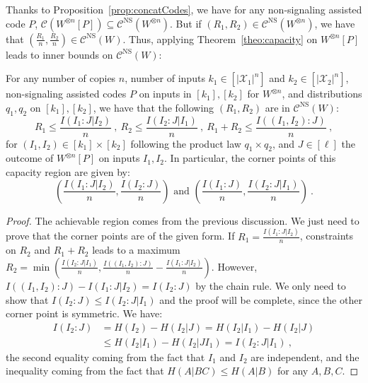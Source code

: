   
  Thanks to Proposition~\ref{prop:concatCodes}, we have for any non-signaling assisted code $P$, $\mathcal{C}(W^{\otimes n}[P]) \subseteq \mathcal{C}^{\mathrm{NS}}(W^{\otimes n})$. But if $(R_1,R_2) \in \mathcal{C}^{\mathrm{NS}}(W^{\otimes n})$, we have that $(\frac{R_1}{n},\frac{R_2}{n}) \in \mathcal{C}^{\mathrm{NS}}(W)$. Thus, applying Theorem~\ref{theo:capacity} on $W^{\otimes n}[P]$ leads to inner bounds on $\mathcal{C}^{\mathrm{NS}}(W)$:
  \begin{proposition}
    \label{prop:NumericalMethod} For any number of copies $n$, number of inputs $k_1 \in [|\mathcal{X}_1|^n]$ and $k_2 \in [|\mathcal{X}_2|^n]$, non-signaling assisted codes $P$ on inputs in $[k_1],[k_2]$ for $W^{\otimes n}$, and distributions $q_1,q_2$ on $[k_1],[k_2]$, we have that the following $(R_1,R_2)$ are in $\mathcal{C}^{\mathrm{NS}}(W)$: 
  \[ R_1 \leq \frac{I(I_1:J|I_2)}{n}\ ,\ R_2 \leq \frac{I(I_2:J|I_1)}{n}\ ,\ R_1+R_2 \leq \frac{I((I_1,I_2):J)}{n} \ ,\]
  for $(I_1,I_2) \in [k_1] \times [k_2]$ following the product law $q_1 \times q_2$, and $J \in [\ell]$ the outcome of $W^{\otimes n }[P]$ on inputs $I_1,I_2$. In particular, the corner points of this capacity region are given by:
  \[ \left(\frac{I(I_1:J|I_2)}{n},\frac{I(I_2 : J)}{n} \right) \text{ and } \left(\frac{I(I_1 : J)}{n} ,\frac{I(I_2:J|I_1)}{n}\right) \ .\]
  \end{proposition}

  \begin{proof}
    The achievable region comes from the previous discussion. We just need to prove that the corner points are of the given form. If $R_1=\frac{I(I_1:J|I_2)}{n}$, constraints on $R_2$ and $R_1+R_2$ leads to a maximum $R_2 = \min\left(\frac{I(I_2:J|I_1)}{n}, \frac{I((I_1,I_2):J)}{n}-\frac{I(I_1:J|I_2)}{n}\right)$. However, $I((I_1,I_2):J)-I(I_1:J|I_2)=I(I_2 : J)$ by the chain rule. We only need to show that $I(I_2:J) \leq I(I_2:J|I_1)$ and the proof will be complete, since the other corner point is symmetric. We have:
    \begin{equation}
      \begin{aligned}
        I(I_2:J) &= H(I_2)-H(I_2|J) = H(I_2|I_1) - H(I_2|J)\\
        &\leq H(I_2|I_1) - H(I_2|JI_1) = I(I_2:J|I_1) \ ,
      \end{aligned}
    \end{equation}
    the second equality coming from the fact that $I_1$ and $I_2$ are independent, and the inequality coming from the fact that $H(A|BC) \leq H(A|B)$ for any $A,B,C$.
  \end{proof}
  
